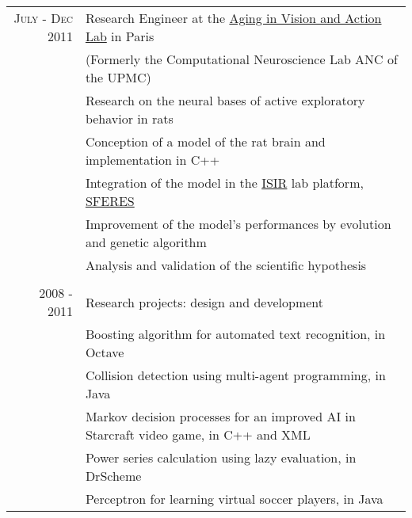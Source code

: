 \documentclass[a4paper,10pt]{article}
\begin{document}
\begin{tabular}{r|p{14cm}}
        \textsc{July - Dec 2011 } & Research Engineer at the \href{http://www.aging-vision-action.fr/}{Aging in Vision and Action Lab} in Paris\\
        & \footnotesize{(Formerly the Computational Neuroscience Lab ANC of the UPMC)}\\
        & \footnotesize{Research on the neural bases of active exploratory behavior in rats}\\
        & \footnotesize{Conception of a model of the rat brain and implementation in C++}\\
        & \footnotesize{Integration of the model in the \href{http://www.isir.upmc.fr/}{ISIR} lab platform, \href{https://github.com/sferes2/sferes2}{SFERES}}\\
        & \footnotesize{Improvement of the model's performances by evolution and genetic algorithm}\\
        & \footnotesize{Analysis and validation of the scientific hypothesis}\\
        \multicolumn{2}{c}{} \\

        \textsc{2008 - 2011} & Research projects: design and development\\
        & \footnotesize{Boosting algorithm for automated text recognition, in Octave}\\
        & \footnotesize{Collision detection using multi-agent programming, in Java}\\
        & \footnotesize{Markov decision processes for an improved AI in Starcraft video game, in C++ and XML}\\
        & \footnotesize{Power series calculation using lazy evaluation, in DrScheme}\\
        & \footnotesize{Perceptron for learning virtual soccer players, in Java}\\

    \end{tabular}\\

\end{document}
